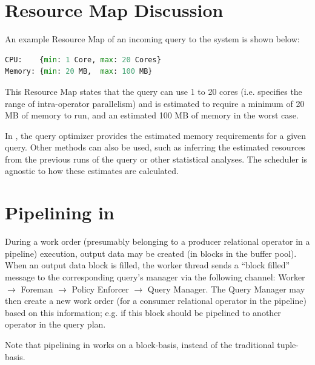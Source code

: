 \section{Resource Map Discussion}\label{apx:resource-map}
An example Resource Map of an incoming query to the system is shown below:
\begin{lstlisting}[language=python, 
								   basicstyle=\ttfamily\small, 
								   showstringspaces=false,
								   keywordstyle=\color{bondiblue}\bfseries, 
								   emph={CPU, Memory}, 
								   emphstyle=\color{cardinal}\bfseries]
CPU:    {min: 1 Core, max: 20 Cores}
Memory: {min: 20 MB,  max: 100 MB}
\end{lstlisting}

This Resource Map states that the query can use 1 to 20 cores (i.e. specifies the range of intra-operator parallelism) and is estimated to require a minimum of 20 MB of memory to run, and an estimated 100 MB of memory in the worst case.

In \sys{}, the query optimizer provides the estimated memory requirements for a given query.
Other methods can also be used, such as inferring the estimated resources from the previous runs of the query or other statistical analyses.
The scheduler is agnostic to how these estimates are calculated.

\section{Pipelining in \sys{}}\label{apx:pipelining}
During a work order (presumably belonging to a producer relational operator in a pipeline) execution, output data may be created (in blocks in the buffer pool). 
When an output data block is filled, the worker thread sends a ``block filled'' message to the corresponding query's manager via the following channel: Worker $\rightarrow$ Foreman $\rightarrow$ Policy Enforcer $\rightarrow$ Query Manager.
The Query Manager may then create a new work order (for a consumer relational operator in the pipeline) based on this information;
e.g. if this block should be pipelined to another operator in the query plan.

Note that pipelining in \sys{} works on a block-basis, instead of the traditional tuple-basis.